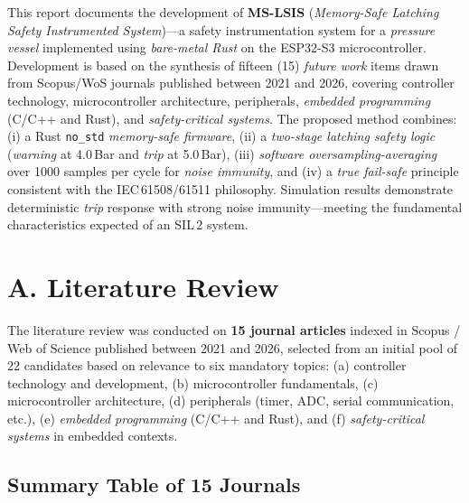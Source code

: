 \documentclass[11pt,a4paper]{article}
\begin{document}
This report documents the development of \textbf{MS-LSIS} (\textit{Memory-Safe Latching Safety Instrumented System})---a safety instrumentation system for a \textit{pressure vessel} implemented using \textit{bare-metal Rust} on the ESP32-S3 microcontroller. Development is based on the synthesis of fifteen (15) \textit{future work} items drawn from Scopus/WoS journals published between 2021 and 2026, covering controller technology, microcontroller architecture, peripherals, \textit{embedded programming} (C/C++ and Rust), and \textit{safety-critical systems}. The proposed method combines: (i) a Rust \texttt{no\_std} \textit{memory-safe firmware}, (ii) a \textit{two-stage latching safety logic} (\textit{warning} at 4.0\,Bar and \textit{trip} at 5.0\,Bar), (iii) \textit{software oversampling-averaging} over 1000 samples per cycle for \textit{noise immunity}, and (iv) a \textit{true fail-safe} principle consistent with the IEC\,61508/61511 philosophy. Simulation results demonstrate deterministic \textit{trip} response with strong noise immunity---meeting the fundamental characteristics expected of an SIL\,2 system.

\section{A. Literature Review}

The literature review was conducted on \textbf{15 journal articles} indexed in Scopus / Web of Science published between 2021 and 2026, selected from an initial pool of 22 candidates based on relevance to six mandatory topics: (a) controller technology and development, (b) microcontroller fundamentals, (c) microcontroller architecture, (d) peripherals (timer, ADC, serial communication, etc.), (e) \textit{embedded programming} (C/C++ and Rust), and (f) \textit{safety-critical systems} in embedded contexts.

\subsection*{Summary Table of 15 Journals}
\end{document}
